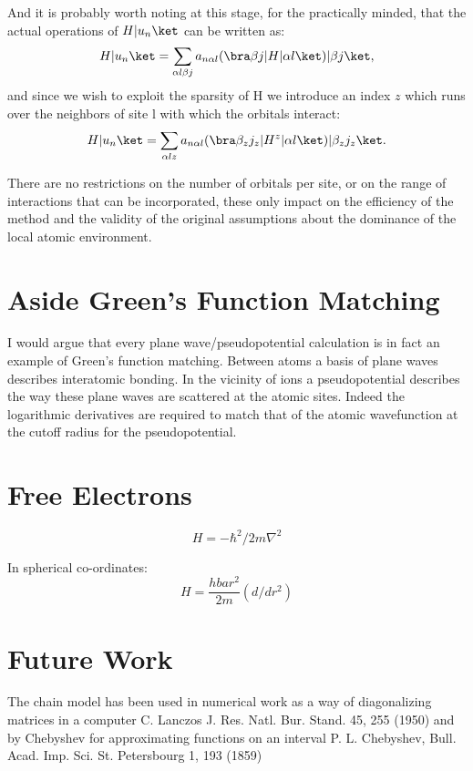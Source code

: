 And it is probably worth noting at this stage, for the practically minded,  
that the actual operations of $H|u_{n}\ket$ can be written as:
%
\begin{equation}
H|u_{n}\ket = \sum_{\alpha l \beta j}a_{n \alpha l}(\bra \beta j |H| \alpha l\ket)|\beta j\ket,
\end{equation}
%
and since we wish to exploit the sparsity of H we introduce an index $z$ which
runs over the neighbors of site l with which the orbitals interact:
\begin{equation}
H|u_{n}\ket = \sum_{\alpha l z}a_{n \alpha l}(\bra \beta_{z} j_{z} |H^{z}|\alpha l\ket)|\beta_{z} j_{z}\ket.
\end{equation}

There are no restrictions on the number of orbitals per site, or on the range of interactions that can be
incorporated, these only impact on the efficiency of the method and the validity of the original assumptions
about the dominance of the local atomic environment.

\section{Aside Green's Function Matching}
I would argue that every plane wave/pseudopotential calculation is in fact
an example of Green's function matching. Between atoms a basis of plane
waves describes interatomic bonding. In the vicinity of ions a pseudopotential
describes the way these plane waves are scattered at the atomic sites.
Indeed the logarithmic derivatives are required to match 
that of the atomic wavefunction at the cutoff radius for the pseudopotential.

\section{Free Electrons}

\begin{equation}
H = - \hbar^{2}/2m \nabla^{2}
\end{equation}


In spherical co-ordinates:
%
\begin{equation}
H = \frac{hbar^{2}}{2m}(d/dr^{2}  ) 
\end{equation}



\section{Future Work}
The chain model has been used in numerical work as a way of 
diagonalizing matrices in a computer 
C. Lanczos J. Res. Natl. Bur. Stand. 45, 255 (1950) and
by Chebyshev for approximating functions on an interval
P. L. Chebyshev, Bull. Acad. Imp. Sci. St. Petersbourg 1, 193 (1859)

